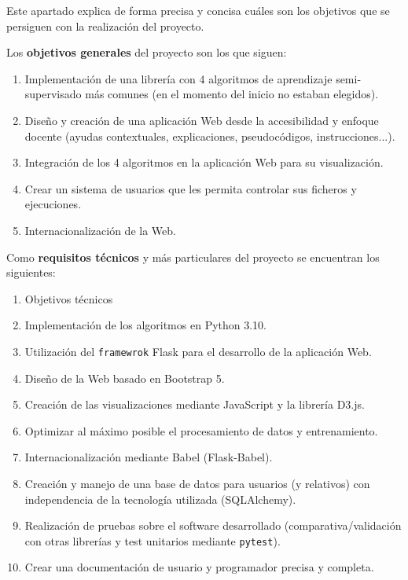 
Este apartado explica de forma precisa y concisa cuáles son los objetivos que se
persiguen con la realización del proyecto.


Los \textbf{objetivos generales} del proyecto son los que siguen:
\begin{enumerate}
    \item Implementación de una librería con 4 algoritmos de aprendizaje
    semi-supervisado más comunes (en el momento del inicio no estaban elegidos).
    \item Diseño y creación de una aplicación Web desde la accesibilidad y
    enfoque docente (ayudas contextuales, explicaciones, pseudocódigos,
    instrucciones...).
    \item Integración de los 4 algoritmos en la aplicación Web para su visualización.
    \item Crear un sistema de usuarios que les permita controlar sus ficheros y ejecuciones.
    \item Internacionalización de la Web.
\end{enumerate}

Como \textbf{requisitos técnicos} y más particulares del proyecto se encuentran
los siguientes:

\begin{enumerate}
    \item Objetivos técnicos
    \item Implementación de los algoritmos en Python 3.10.
    \item Utilización del \texttt{framewrok} Flask para el desarrollo de la
    aplicación Web.
    \item Diseño de la Web basado en Bootstrap 5.
    \item Creación de las visualizaciones mediante JavaScript y la librería
    D3.js.
    \item Optimizar al máximo posible el procesamiento de datos y entrenamiento.
    \item Internacionalización mediante Babel (Flask-Babel).
    \item Creación y manejo de una base de datos para usuarios (y relativos) con
    independencia de la tecnología utilizada (SQLAlchemy).
    \item Realización de pruebas sobre el software desarrollado
    (comparativa/validación con otras librerías y test unitarios mediante
    \texttt{pytest}).
    \item Crear una documentación de usuario y programador precisa y completa.
\end{enumerate}